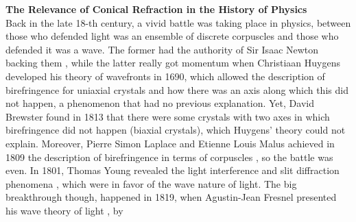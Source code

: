 \documentclass[11pt, a4paper, twoside]{article} %
\DeclareRobustCommand{\mybox}[2][gray!10]{%
\begin{tcolorbox}[   %
        left=0.2cm,
        right=0.2cm,
        top=0.15cm,
        bottom=0.15cm,
        colback=#1,
        colframe=#1,
        width=\dimexpr\textwidth\relax, 
        enlarge left by=0mm,
        boxsep=5pt,
        arc=0pt,outer arc=0pt,
        ]
        #2
\end{tcolorbox}
}
\begin{document}
\mybox{{\bf The Relevance of Conical Refraction in the History of Physics}\vspace{0.2cm}\\
Back in the late 18-th century, a vivid battle was taking place in physics, between those who defended light was an ensemble of discrete corpuscles and those who defended it was a wave. The former had the authority of Sir Isaac Newton backing them \cite{newton}, while the latter really got momentum when Christiaan Huygens developed his theory of wavefronts \cite{huygens} in 1690, which allowed the description of birefringence for uniaxial crystals and how there was an axis along which this did not happen, a phenomenon that had no previous explanation. Yet, David Brewster found in 1813 that there were some crystals with two axes in which birefringence did not happen (biaxial crystals), which Huygens' theory could not explain. Moreover, Pierre Simon Laplace and Etienne Louis Malus achieved in 1809 the description of birefringence in terms of corpuscles \cite{laplace,malus}, so the battle was even. In 1801, Thomas Young revealed the light interference and slit diffraction phenomena \cite{young}, which were in favor of the wave nature of light. The big breakthrough though, happened in 1819, when Agustin-Jean Fresnel presented his wave theory of light \cite{fresnel}, by}
\end{document}

